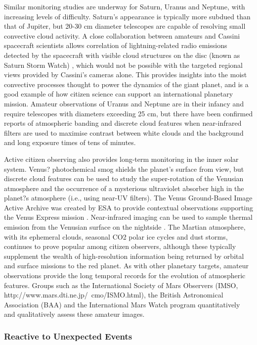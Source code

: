 \documentclass{ar2e}
\begin{document}
Similar monitoring studies are underway for Saturn, Uranus and Neptune, with
increasing levels of difficulty.  Saturn's appearance is typically more
subdued than that of Jupiter, but 20-30 cm diameter telescopes are capable of
resolving small convective cloud activity.  A close collaboration between
amateurs and Cassini spacecraft scientists allows correlation of
lightning-related radio emissions detected by the spacecraft with visible
cloud structures on the disc (known as Saturn Storm Watch)
\citep[e.g.,][]{11fischer}, which would not be possible with the targeted
regional views provided by Cassini's cameras alone.  This provides insights
into the moist convective processes thought to power the dynamics of the giant
planet, and is a good example of how citizen science can support an
international planetary mission. Amateur observations of Uranus and Neptune
are in their infancy and require telescopes with diameters exceeding 25 cm,
but there have been confirmed reports of atmospheric banding and discrete
cloud features when near-infrared filters are used to maximise contrast
between white clouds and the background and long exposure times of tens of
minutes.

Active citizen observing also provides long-term monitoring in the inner solar
system.  Venus? photochemical smog shields the planet's surface from view, but
discrete cloud features can be used to study the super-rotation of the
Venusian atmosphere and the occurrence of a mysterious ultraviolet absorber
high in the planet?s atmosphere (i.e., using near-UV filters).  The Venus
Ground-Based Image Active Archive was created by ESA to provide contextual
observations supporting the Venus Express mission \citep{08barentsen}. 
Near-infrared imaging can be used to sample thermal emission from the Venusian
surface on the nightside \citep{93lecacheax}.  The Martian atmosphere, with
its ephemeral clouds, seasonal CO2 polar ice cycles and dust storms, continues
to prove popular among citizen observers, although these typically supplement
the wealth of high-resolution information being returned by orbital and
surface missions to the red planet.  As with other planetary targets, amateur
observations provide the long temporal records for the evolution of
atmospheric features.  Groups such as the International Society of Mars
Observers (IMSO, http://www.mars.dti.ne.jp/~cmo/ISMO.html), the British
Astronomical Association (BAA) and the International Mars Watch program
quantitatively and qualitatively assess these amateur images. 
 
\subsubsection{Reactive to Unexpected Events}
\end{document}
